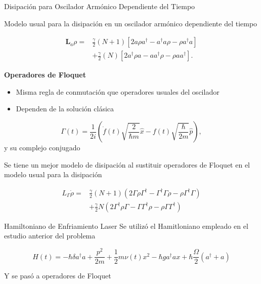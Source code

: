 \documentclass[10pt]{beamer}
\begin{document}
\begin{frame}{Disipación para Oscilador Armónico Dependiente del Tiempo}

Modelo usual para la disipación en un oscilador armónico dependiente del tiempo

\begin{align*}
\textbf{L}_a \rho =& \frac{\gamma}{2}(N + 1)[2a\rho a^\dagger -a^\dagger a\rho - \rho a^\dagger a ] \nonumber \\
 &+ \frac{\gamma}{2}(N)[2a^\dagger\rho a -aa^\dagger\rho - \rho  aa^\dagger ].
\end{align*} 

\end{frame}

\begin{frame}
\textbf{Operadores de Floquet}

\begin{itemize}
\item Misma regla de conmutación que operadores usuales del oscilador

\item Dependen de la solución clásica
\end{itemize}

\begin{equation*}
\Gamma(t) = \frac{1}{2i}(\dot{f}(t)\sqrt{\frac{2}{\hbar m}}\hat{x}-f(t)\sqrt{\frac{\hbar}{2m}}\hat{p}),
\end{equation*} y su complejo conjugado

\end{frame}

\begin{frame}
Se tiene un mejor modelo de disipación al sustituir operadores de Floquet en el modelo usual para la disipación

\begin{align*} 
L_\Gamma \dot{\rho}=&\frac{\gamma}{2}(N+1)(2\Gamma\rho\Gamma^\dagger - \Gamma^\dagger\Gamma \rho - \rho \Gamma^\dagger \Gamma )\\
 &+ \frac{\gamma}{2}N(2\Gamma^\dagger \rho \Gamma - \Gamma \Gamma^\dagger \rho - \rho \Gamma\Gamma^\dagger)
\end{align*}
\end{frame}


\begin{frame}{Hamiltoniano de Enfriamiento Laser}
Se utilizó el Hamitloniano empleado en el estudio anterior del problema

\begin{equation*}
H(t) = -\hbar \delta a^\dagger a + \frac{p^2}{2m} + \frac{1}{2}m \nu (t) x^2 -\hbar g a^\dagger a x + \hbar\frac{\Omega}{2}(a^\dagger + a)
\end{equation*}

Y se pasó a operadores de Floquet

\end{frame}
\end{document}
